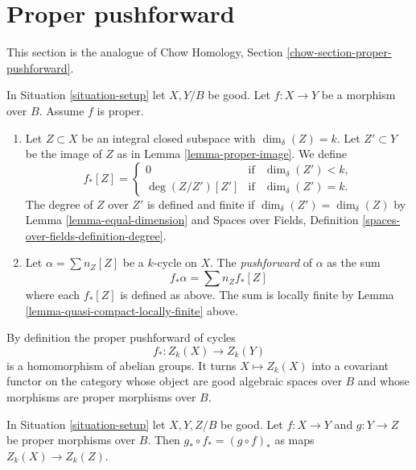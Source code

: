\section{Proper pushforward}
\label{section-proper-pushforward}

\noindent
This section is the analogue of
Chow Homology, Section \ref{chow-section-proper-pushforward}.

\begin{definition}
\label{definition-proper-pushforward}
In Situation \ref{situation-setup} let $X, Y/B$ be good.
Let $f : X \to Y$ be a morphism over $B$.
Assume $f$ is proper.
\begin{enumerate}
\item Let $Z \subset X$ be an integral closed subspace
with $\dim_\delta(Z) = k$. Let $Z' \subset Y$ be the
image of $Z$ as in Lemma \ref{lemma-proper-image}.
We define
$$
f_*[Z] =
\left\{
\begin{matrix}
0 & \text{if} & \dim_\delta(Z')< k, \\
\deg(Z/Z') [Z'] & \text{if} & \dim_\delta(Z') = k.
\end{matrix}
\right.
$$
The degree of $Z$ over $Z'$ is defined and finite if
$\dim_\delta(Z') = \dim_\delta(Z)$ by Lemma \ref{lemma-equal-dimension} and
Spaces over Fields, Definition \ref{spaces-over-fields-definition-degree}.
\item Let $\alpha = \sum n_Z [Z]$ be a $k$-cycle on $X$. The
{\it pushforward} of $\alpha$ as the sum
$$
f_* \alpha = \sum n_Z f_*[Z]
$$
where each $f_*[Z]$ is defined as above. The sum is locally finite
by Lemma \ref{lemma-quasi-compact-locally-finite} above.
\end{enumerate}
\end{definition}

\noindent
By definition the proper pushforward of cycles
$$
f_* : Z_k(X) \longrightarrow Z_k(Y)
$$
is a homomorphism of abelian groups. It turns $X \mapsto Z_k(X)$
into a covariant functor on the category whose object are good
algebraic spaces over $B$ and whose morphisms are proper morphisms
over $B$.

\begin{lemma}
\label{lemma-compose-pushforward}
In Situation \ref{situation-setup} let $X, Y, Z/B$ be good.
Let $f : X \to Y$ and $g : Y \to Z$ be proper morphisms over $B$.
Then $g_* \circ f_* = (g \circ f)_*$ as maps $Z_k(X) \to Z_k(Z)$.
\end{lemma}

